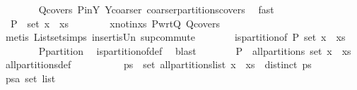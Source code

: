 \begin{isabellebody}
\ \ \ \ \ \ \isamarkupfalse%
\ Q{\isacharunderscore}covers\ P{\isacharunderscore}in{\isacharunderscore}Y\ Y{\isacharunderscore}coarser{\isacharprime}\ coarser{\isacharunderscore}partitions{\isacharunderscore}covers\ \isamarkupfalse%
\ fast\isanewline
\ \ \ \ \isamarkupfalse%
\ \isamarkupfalse%
\ {\isachardoublequoteopen}{\isasymUnion}\ P\ {\isacharequal}\ set\ {\isacharparenleft}x\ {\isacharhash}\ xs{\isacharparenright}{\isachardoublequoteclose}\isanewline
\ \ \ \ \ \ \isamarkupfalse%
\ x{\isacharunderscore}notin{\isacharunderscore}xs\ P{\isacharunderscore}wrt{\isacharunderscore}Q\ Q{\isacharunderscore}covers\isanewline
\ \ \ \ \ \ \isamarkupfalse%
\ {\isacharparenleft}metis\ List{\isachardot}set{\isacharunderscore}simps{\isacharparenleft}{}{\isacharparenright}\ insert{\isacharunderscore}is{\isacharunderscore}Un\ sup{\isacharunderscore}commute{\isacharparenright}\isanewline
\ \ \ \ \isamarkupfalse%
\ \isamarkupfalse%
\ {\isachardoublequoteopen}is{\isacharunderscore}partition{\isacharunderscore}of\ P\ {\isacharparenleft}set\ {\isacharparenleft}x\ {\isacharhash}\ xs{\isacharparenright}{\isacharparenright}{\isachardoublequoteclose}\isanewline
\ \ \ \ \ \ \isamarkupfalse%
\ P{\isacharunderscore}partition\ \isamarkupfalse%
\ is{\isacharunderscore}partition{\isacharunderscore}of{\isacharunderscore}def\ \isamarkupfalse%
\ blast\isanewline
\ \ \ \ \isamarkupfalse%
\ \isamarkupfalse%
\ {\isachardoublequoteopen}P\ {\isasymin}\ all{\isacharunderscore}partitions\ {\isacharparenleft}set\ {\isacharparenleft}x\ {\isacharhash}\ xs{\isacharparenright}{\isacharparenright}{\isachardoublequoteclose}\ \isamarkupfalse%
\ all{\isacharunderscore}partitions{\isacharunderscore}def\ \isacommand{{\isachardot}{\isachardot}}\isamarkupfalse%
\isanewline
\ \ \isamarkupfalse%
\isanewline
\ \ \isamarkupfalse%
\ \isamarkupfalse%
\ {\isachardoublequoteopen}{\isasymforall}\ ps\ {\isasymin}\ set\ {\isacharparenleft}all{\isacharunderscore}partitions{\isacharunderscore}list\ {\isacharparenleft}x\ {\isacharhash}\ xs{\isacharparenright}{\isacharparenright}\ {\isachardot}\ distinct\ ps{\isachardoublequoteclose}\isanewline
\ \ \isamarkupfalse%
\isanewline
\ \ \ \ \isamarkupfalse%
\ ps{\isacharcolon}{\isacharcolon}{\isachardoublequoteopen}{\isacharprime}a\ set\ list{\isachardoublequoteclose}\ \isamarkupfalse%

\end{isabellebody}
